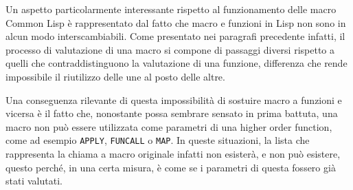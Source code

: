 Un aspetto particolarmente interessante rispetto al funzionamento delle macro
Common Lisp è rappresentato dal fatto che macro e funzioni in Lisp non sono in
alcun modo interscambiabili. Come presentato nei paragrafi precedente infatti,
il processo di valutazione di una macro si compone di passaggi diversi
rispetto a quelli che contraddistinguono la valutazione di una funzione,
differenza che rende impossibile il riutilizzo delle une al posto delle altre.

Una conseguenza rilevante di questa impossibilità di sostuire macro a funzioni
e vicersa è il fatto che, nonostante possa sembrare sensato in prima battuta,
una macro non può essere utilizzata come parametri di una higher order
function, come ad esempio \texttt{APPLY}, \texttt{FUNCALL} o \texttt{MAP}. In
queste situazioni, la lista che rappresenta la chiama a macro originale
infatti non esisterà, e non può esistere, questo perché, in una certa misura,
è come se i parametri di questa fossero già stati valutati.
